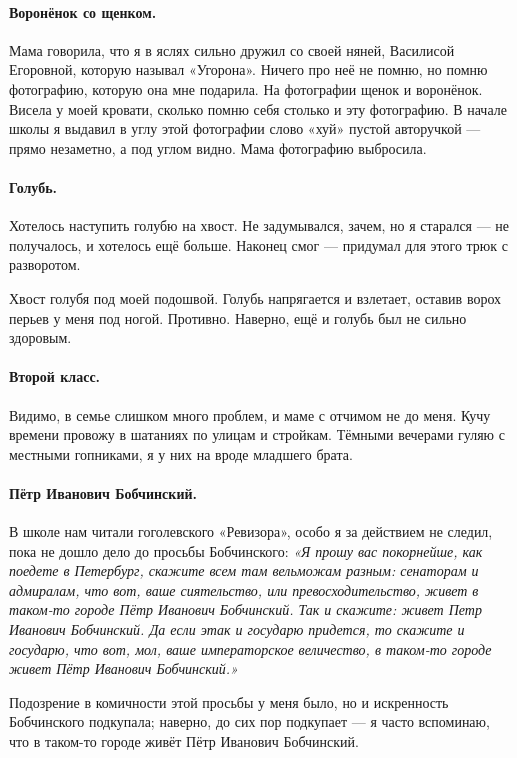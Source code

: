 \documentclass{book}
\begin{document}
\paragraph{Воронёнок со щенком.}
Мама говорила, что я в яслях сильно дружил со своей няней, Василисой Егоровной,
которую называл «Угорона».
Ничего про неё не помню, но помню фотографию, которую она мне подарила.
На фотографии щенок и воронёнок.
Висела у моей кровати, сколько помню себя столько и эту фотографию.
В начале школы я выдавил в углу этой фотографии слово «хуй» пустой авторучкой --- прямо незаметно, а под углом видно.
Мама фотографию выбросила.

\paragraph{Голубь.}
Хотелось наступить голубю на хвост.
Не задумывался, зачем, но я старался — не получалось, и хотелось ещё больше.
Наконец смог — придумал для этого трюк с разворотом.

Хвост голубя под моей подошвой.
Голубь напрягается и взлетает, оставив ворох перьев у меня под ногой.
Противно.
Наверно, ещё и голубь был не сильно здоровым.

\paragraph{Второй класс.} 
Видимо, в семье слишком много проблем, и маме с отчимом не до меня.
Кучу времени провожу в шатаниях по улицам и стройкам.
Тёмными вечерами гуляю с местными гопниками, 
я у них на вроде младшего брата.

\paragraph{Пётр Иванович Бобчинский.}
В школе нам читали гоголевского «Ревизора», особо я за действием не следил, пока не дошло дело до просьбы Бобчинского:
\textit{«Я прошу вас покорнейше, как поедете в Петербург, скажите всем там вельможам разным: сенаторам и адмиралам, что вот, ваше сиятельство, или превосходительство, живет в таком-то городе Пётр Иванович Бобчинский.
Так и скажите: живет Петр Иванович Бобчинский. Да если этак и государю придется, то скажите и государю, что вот, мол, ваше императорское величество, в таком-то городе живет Пётр Иванович Бобчинский.»}

Подозрение в комичности этой просьбы у меня было, но и искренность Бобчинского подкупала; наверно, до сих пор подкупает --- я часто вспоминаю, что в таком-то городе живёт Пётр Иванович Бобчинский.
\end{document}
